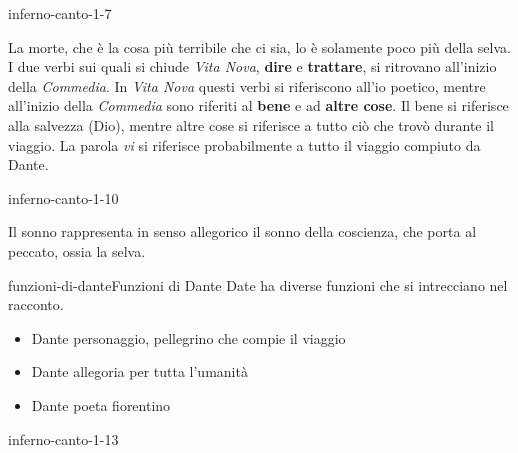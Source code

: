 \documentclass[preview]{standalone}
\begin{document}
\begin{snippet}{inferno-canto-1-7}
    
    La morte, che è la cosa più terribile che ci sia, lo è solamente poco più della selva.
    \\
    I due verbi sui quali si chiude \textit{Vita Nova},
    \textbf{dire} e \textbf{trattare}, si ritrovano all'inizio della \textit{Commedia}.
    In \textit{Vita Nova} questi verbi si riferiscono all'io poetico, mentre all'inizio della \textit{Commedia}
    sono riferiti al \textbf{bene} e ad \textbf{altre cose}.
    Il bene si riferisce alla salvezza (Dio), mentre altre cose si riferisce a tutto ciò che trovò durante il viaggio.
    La parola \textit{vi} si riferisce probabilmente a tutto il viaggio compiuto da Dante.
\end{snippet}

\begin{snippet}{inferno-canto-1-10}
    
    Il sonno rappresenta in senso allegorico il sonno della coscienza,
    che porta al peccato, ossia la selva.
\end{snippet}

\begin{snippetnote}{funzioni-di-dante}{Funzioni di Dante}
    Date ha diverse funzioni che si intrecciano nel racconto.
    \begin{itemize}
        \item Dante personaggio, pellegrino che compie il viaggio
        \item Dante allegoria per tutta l'umanità
        \item Dante poeta fiorentino
    \end{itemize}
\end{snippetnote}

\begin{snippet}{inferno-canto-1-13}

\end{snippet}
\end{document}
